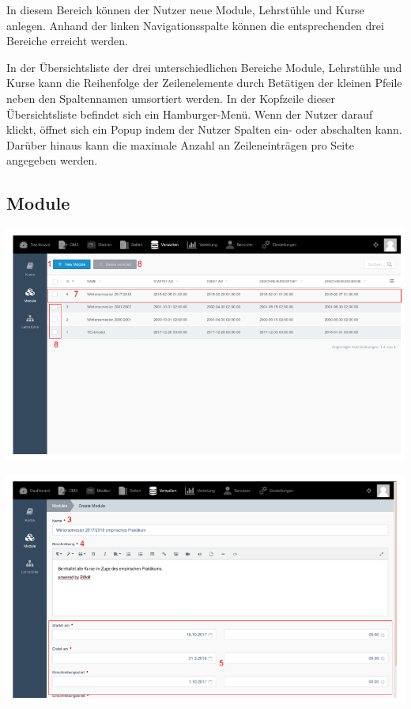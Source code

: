     In diesem Bereich können der Nutzer neue Module, Lehrstühle und Kurse anlegen.
    Anhand der linken Navigationsspalte können die entsprechenden drei Bereiche erreicht werden.

    In der Übersichtsliste der drei unterschiedlichen Bereiche Module, Lehrstühle und Kurse kann die Reihenfolge der Zeilenelemente durch Betätigen
    der kleinen Pfeile neben den Spaltennamen umsortiert werden.
    In der Kopfzeile dieser Übersichtsliste befindet sich ein Hamburger-Menü. 
    Wenn der Nutzer darauf klickt, öffnet sich ein Popup indem der Nutzer Spalten ein- oder abschalten kann.
    Darüber hinaus kann die maximale Anzahl an Zeileneinträgen pro Seite angegeben werden.
    
    \subsection{Module}
    
    \includegraphics[scale=0.3]{backend/img/module_1.png}

    \includegraphics[scale=0.3]{backend/img/module_2.png}

